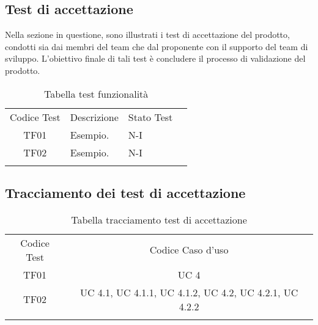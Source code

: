 \subsection{Test di accettazione}
Nella sezione in questione, sono illustrati i test di accettazione del prodotto, condotti sia dai membri del team che dal proponente con il supporto del team di sviluppo. L'obiettivo finale di tali test è concludere il processo di validazione del prodotto.
\\
\begin{table}[htbp]
    \centering
    \begin{tabular}{|c|p{3cm}|p{5cm}|c|}
        \hhline{----}
        Codice Test & Descrizione & Stato Test \\
        \hhline{---}
        TF01 & Esempio. & N-I \\
        \hhline{----}
        TF02 & Esempio. & N-I \\
        \hhline{----}
    \end{tabular}
    \caption{Tabella test funzionalità}
    \label{tab:testsAccettazione}
\end{table}

\subsection{Tracciamento dei test di accettazione}
\begin{table}[htbp]
    \centering
    \begin{tabular}{|c|c|}
        \hhline{--}
        Codice Test & Codice Caso d'uso \\
        \hhline{--}
        TF01 & UC 4 \\
        \hhline{--}
        TF02 & UC 4.1, UC 4.1.1, UC 4.1.2, UC 4.2, UC 4.2.1, UC 4.2.2 \\
        \hhline{--}
    \end{tabular}
    \caption{Tabella tracciamento test di accettazione}
    \label{tab:testsTracciamentoAcc}
\end{table}

